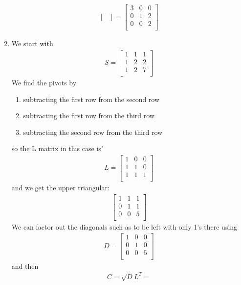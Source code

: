 \documentclass[a4paper,11pt]{article}
\newcommand{\?}{\stackrel{?}{=}}
\begin{document}
\begin{enumerate}
\begin{align*}
\begin{bmatrix}
\end{bmatrix}
=
\begin{bmatrix}
3 & 0 & 0 \\
0 & 1 & 2 \\
0 & 0 & 2 \\
\end{bmatrix}
\end{align*}
\item
We start with
\begin{align*}
S = 
\begin{bmatrix}
1 & 1 & 1 \\
1 & 2 & 2 \\
1 & 2 & 7 \\
\end{bmatrix}
\end{align*}
We find the pivots by 
\begin{enumerate}
\item subtracting the first row from the second row 
\item subtracting the first row from the third row
\item subtracting the second row from the third row
\end{enumerate}
so the L matrix in this case is"
\begin{align*}
L = 
\begin{bmatrix}
1 & 0 & 0 \\
1 & 1 & 0 \\
1 & 1 & 1 \\
\end{bmatrix}
\end{align*}
and we get the upper triangular:
\begin{align*} 
\begin{bmatrix}
1 & 1 & 1 \\
0 & 1 & 1 \\
0 & 0 & 5 \\
\end{bmatrix}
\end{align*}
We can factor out the diagonals such as to be left with only 1's there using 
\begin{align*}
D = 
\begin{bmatrix}
1 & 0 & 0 \\
0 & 1 & 0 \\
0 & 0 & 5 \\
\end{bmatrix}
\end{align*}
and then 
\begin{align*}
C = \sqrt{D}L^T =

\end{align*}
\end{enumerate}
\end{document}
